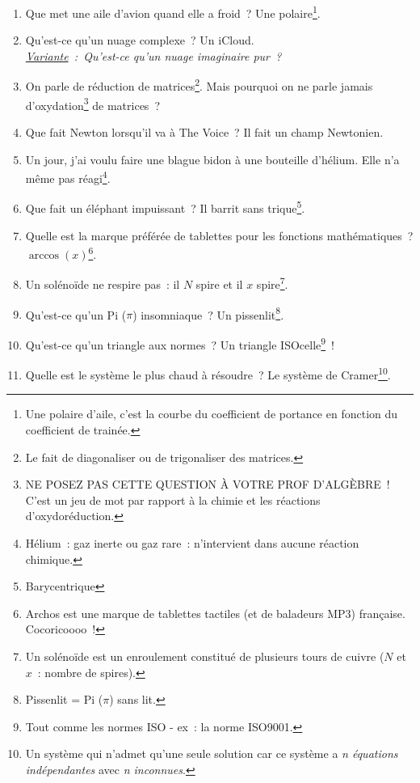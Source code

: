 \documentclass[10pt,a5paper,fullpage]{book}
\begin{document}
\begin{enumerate}
		\item Que met une aile d’avion quand elle a froid~? Une polaire\footnote{Une polaire d’aile, c’est la courbe du coefficient de portance en fonction du coefficient de trainée.}.
		\item Qu’est-ce qu’un nuage complexe~? Un iCloud. \\\textit{\underline{Variante}~: Qu’est-ce qu’un nuage imaginaire pur~?}
		\item On parle de réduction de matrices\footnote{Le fait de diagonaliser ou de trigonaliser des matrices.}. Mais pourquoi on ne parle jamais d’oxydation\footnote{NE POSEZ PAS CETTE QUESTION À VOTRE PROF D’ALGÈBRE~! C’est un jeu de mot par rapport à la chimie et les réactions d’oxydoréduction.} de matrices~?
		\item Que fait Newton lorsqu’il va à The Voice~? Il fait un champ Newtonien.
		\item Un jour, j’ai voulu faire une blague bidon à une bouteille d’hélium. Elle n’a même pas réagi\footnote{Hélium~: gaz inerte ou gaz rare~: n’intervient dans aucune réaction chimique.}.
		\item Que fait un éléphant impuissant~? Il barrit sans trique\footnote{Barycentrique}.
		\item Quelle est la marque préférée de tablettes pour les fonctions mathématiques~? $\arccos(x)$\footnote{Archos est une marque de tablettes tactiles (et de baladeurs MP3) française. Cocoricoooo~!}.
		\item Un solénoïde ne respire pas~: il $N$ spire et il $x$ spire\footnote{Un solénoïde est un enroulement constitué de plusieurs tours de cuivre ($N$ et $x$~: nombre de spires).}. 
		\item Qu’est-ce qu’un Pi ($\pi$) insomniaque~? Un pissenlit\footnote{Pissenlit = Pi ($\pi$) sans lit.}.
		\item Qu’est-ce qu’un triangle aux normes~? Un triangle ISOcelle\footnote{Tout comme les normes ISO - ex~: la norme ISO9001.}~!
		\item Quelle est le système le plus chaud à résoudre~? Le système de Cramer\footnote{Un système qui n’admet qu’une seule solution car ce système a \textit{n équations indépendantes} avec \textit{n inconnues}.}.

\end{enumerate}
\end{document}
